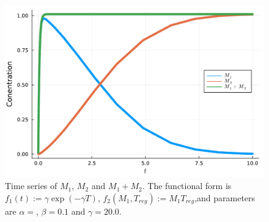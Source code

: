 \documentclass{jsarticle}
\begin{document}
\begin{figure}[h]
  \centering
    \includegraphics[width=12cm,clip]{../fig/masafig01.pdf}
        \caption{Time series of $M_1$, $M_2$ and $M_1+M_2$. The functional form is $f_1(t):= \gamma\exp{(-\gamma T)}$, $f_2(M_1, T_{reg}):=M_1T_{reg}$,and parameters are $\alpha=$, $\beta=0.1$ and $\gamma=20.0$.}
      \label{fig:01}
  \end{figure}
\end{document}

